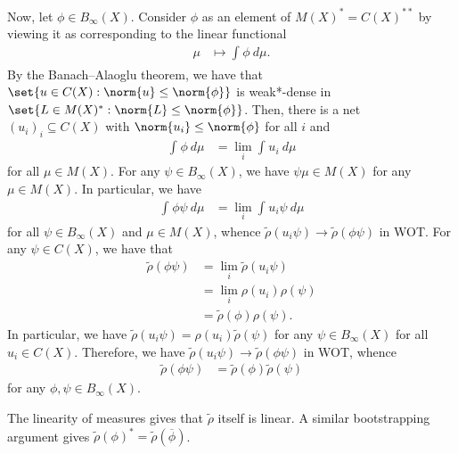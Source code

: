 \documentclass[10pt]{mypackage}
\begin{document}
\begin{theorem}
  Now, let $\phi\in B_{\infty}(X)$. Consider $ \phi $ as an element of $ M(X)^{\ast} = C(X)^{\ast\ast}$ by viewing it as corresponding to the linear functional
  \begin{align*}
    \mu &\mapsto \int_{}^{} \phi\:d\mu.
  \end{align*}
  By the Banach--Alaoglu theorem, we have that $\set{u\in C(X) : \norm{u}\leq \norm{\phi}}$ is weak*-dense in $\set{L\in M(X)^{\ast} : \norm{L}\leq \norm{\phi}}$. Then, there is a net $\left( u_i \right)_i\subseteq C(X)$ with $\norm{u_i}\leq \norm{\phi}$ for all $i$ and
  \begin{align*}
    \int_{}^{} \phi\:d\mu &= \lim_{i} \int_{}^{} u_i\:d\mu
  \end{align*}
  for all $\mu\in M(X)$. For any $\psi\in B_{\infty}(X)$, we have $\psi\mu \in M(X)$ for any $\mu\in M(X)$. In particular, we have
  \begin{align*}
    \int_{}^{} \phi\psi\:d\mu &= \lim_{i} \int_{}^{} u_i\psi\:d\mu
  \end{align*}
  for all $\psi\in B_{\infty}(X)$ and $\mu\in M(X)$, whence $ \widetilde{\rho}\left( u_i\psi \right)\rightarrow \widetilde{\rho}\left( \phi\psi \right) $ in WOT. For any $\psi\in C(X)$, we have that 
  \begin{align*}
    \widetilde{\rho}\left( \phi\psi \right) &= \lim_i \widetilde{\rho}\left( u_i\psi \right)\\
                                            &= \lim_i \rho\left( u_i \right)\rho\left( \psi \right)\\
                                            &= \widetilde{\rho}\left( \phi \right)\rho\left( \psi \right).
  \end{align*}
  In particular, we have $ \widetilde{\rho}\left( u_i\psi \right) = \rho\left( u_i \right) \widetilde{\rho}\left( \psi \right) $ for any $\psi\in B_{\infty}(X)$ for all $u_i\in C(X)$. Therefore, we have $ \widetilde{\rho}\left( u_i\psi \right) \rightarrow \widetilde{\rho}\left( \phi\psi \right) $ in WOT, whence
  \begin{align*}
    \widetilde{\rho}\left( \phi\psi \right) &= \widetilde{\rho}\left( \phi \right)\widetilde{\rho}\left( \psi \right)
  \end{align*}
  for any $\phi,\psi\in B_{\infty}(X)$.

  The linearity of measures gives that $ \widetilde{\rho} $ itself is linear. A similar bootstrapping argument gives $ \widetilde{\rho}\left( \phi \right)^{\ast} = \widetilde{\rho}\left( \overline{\phi} \right) $.


\end{theorem}
\end{document}
